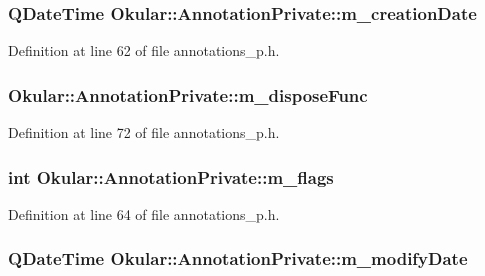 \hypertarget{classOkular_1_1AnnotationPrivate_ad4afb1827157f15bf3b5984e5f62c7a3}{
\subsubsection[{m\+\_\+creation\+Date}]{\setlength{\rightskip}{0pt plus 5cm}Q\+Date\+Time Okular\+::\+Annotation\+Private\+::m\+\_\+creation\+Date}}\label{classOkular_1_1AnnotationPrivate_ad4afb1827157f15bf3b5984e5f62c7a3}


Definition at line 62 of file annotations\+\_\+p.\+h.

\hypertarget{classOkular_1_1AnnotationPrivate_a70d2e116a0c842eacddb589269e554eb}{
\subsubsection[{m\+\_\+dispose\+Func}]{ Okular\+::\+Annotation\+Private\+::m\+\_\+dispose\+Func}}\label{classOkular_1_1AnnotationPrivate_a70d2e116a0c842eacddb589269e554eb}


Definition at line 72 of file annotations\+\_\+p.\+h.

\hypertarget{classOkular_1_1AnnotationPrivate_ae7ada31b42bb74e306f26a9126110226}{
\subsubsection[{m\+\_\+flags}]{\setlength{\rightskip}{0pt plus 5cm}int Okular\+::\+Annotation\+Private\+::m\+\_\+flags}}\label{classOkular_1_1AnnotationPrivate_ae7ada31b42bb74e306f26a9126110226}


Definition at line 64 of file annotations\+\_\+p.\+h.

\hypertarget{classOkular_1_1AnnotationPrivate_a8663feeb255860d7c7b57b389c307b0d}{
\subsubsection[{m\+\_\+modify\+Date}]{\setlength{\rightskip}{0pt plus 5cm}Q\+Date\+Time Okular\+::\+Annotation\+Private\+::m\+\_\+modify\+Date}}\label{classOkular_1_1AnnotationPrivate_a8663feeb255860d7c7b57b389c307b0d}


